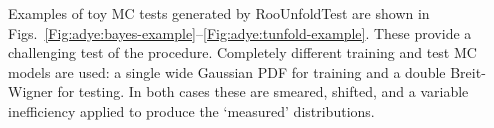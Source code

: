 \documentclass{cernrep}
\begin{document}
Examples of toy MC tests generated by RooUnfoldTest
are shown in Figs.~\ref{Fig:adye:bayes-example}--\ref{Fig:adye:tunfold-example}.
These provide a challenging test of the procedure.
Completely different training and test MC models are used:
a single wide Gaussian PDF for training and a
double Breit-Wigner for testing. In both cases
these are smeared, shifted, and a variable inefficiency
applied to produce the `measured' distributions.%
\begin{figure}
\end{figure}
\end{document}
